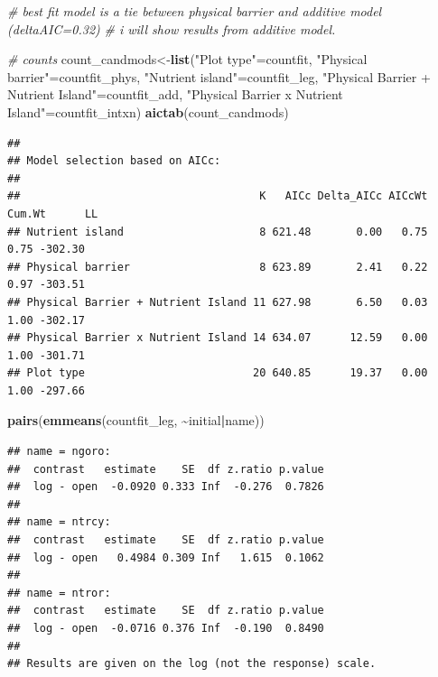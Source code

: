 \documentclass[
]{article}
\newenvironment{Shaded}{\begin{snugshade}}{\end{snugshade}}
\newcommand{\CommentTok}[1]{\textcolor[rgb]{0.56,0.35,0.01}{\textit{#1}}}
\newcommand{\FunctionTok}[1]{\textcolor[rgb]{0.13,0.29,0.53}{\textbf{#1}}}
\newcommand{\NormalTok}[1]{#1}
\newcommand{\OtherTok}[1]{\textcolor[rgb]{0.56,0.35,0.01}{#1}}
\newcommand{\SpecialCharTok}[1]{\textcolor[rgb]{0.81,0.36,0.00}{\textbf{#1}}}
\newcommand{\StringTok}[1]{\textcolor[rgb]{0.31,0.60,0.02}{#1}}
\begin{document}
\begin{Shaded}
\begin{Highlighting}[]
\CommentTok{\# best fit model is a tie between physical barrier and additive model (deltaAIC=0.32)}
\CommentTok{\# i will show results from additive model. }

\CommentTok{\# counts}
\NormalTok{count\_candmods}\OtherTok{\textless{}{-}}\FunctionTok{list}\NormalTok{(}\StringTok{"Plot type"}\OtherTok{=}\NormalTok{countfit, }
                     \StringTok{"Physical barrier"}\OtherTok{=}\NormalTok{countfit\_phys,}
                     \StringTok{"Nutrient island"}\OtherTok{=}\NormalTok{countfit\_leg,}
                     \StringTok{"Physical Barrier + Nutrient Island"}\OtherTok{=}\NormalTok{countfit\_add,}
                     \StringTok{"Physical Barrier x Nutrient Island"}\OtherTok{=}\NormalTok{countfit\_intxn)}
\FunctionTok{aictab}\NormalTok{(count\_candmods) }
\end{Highlighting}
\end{Shaded}

\begin{verbatim}
## 
## Model selection based on AICc:
## 
##                                     K   AICc Delta_AICc AICcWt Cum.Wt      LL
## Nutrient island                     8 621.48       0.00   0.75   0.75 -302.30
## Physical barrier                    8 623.89       2.41   0.22   0.97 -303.51
## Physical Barrier + Nutrient Island 11 627.98       6.50   0.03   1.00 -302.17
## Physical Barrier x Nutrient Island 14 634.07      12.59   0.00   1.00 -301.71
## Plot type                          20 640.85      19.37   0.00   1.00 -297.66
\end{verbatim}

\begin{Shaded}
\begin{Highlighting}[]
\FunctionTok{pairs}\NormalTok{(}\FunctionTok{emmeans}\NormalTok{(countfit\_leg, }\SpecialCharTok{\textasciitilde{}}\NormalTok{initial}\SpecialCharTok{|}\NormalTok{name))}
\end{Highlighting}
\end{Shaded}

\begin{verbatim}
## name = ngoro:
##  contrast   estimate    SE  df z.ratio p.value
##  log - open  -0.0920 0.333 Inf  -0.276  0.7826
## 
## name = ntrcy:
##  contrast   estimate    SE  df z.ratio p.value
##  log - open   0.4984 0.309 Inf   1.615  0.1062
## 
## name = ntror:
##  contrast   estimate    SE  df z.ratio p.value
##  log - open  -0.0716 0.376 Inf  -0.190  0.8490
## 
## Results are given on the log (not the response) scale.
\end{verbatim}
\end{document}
